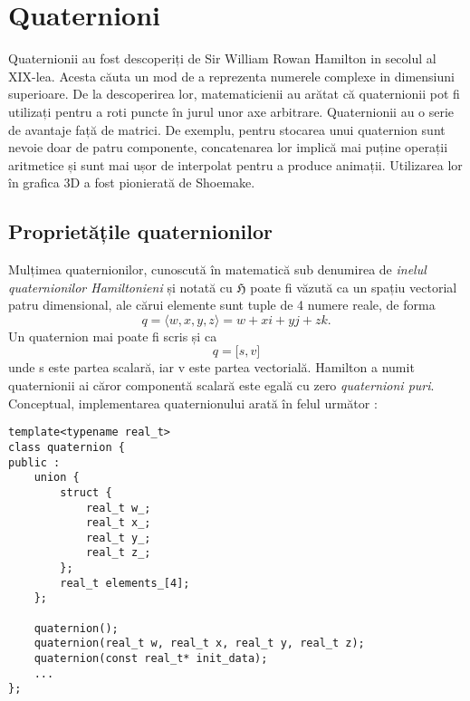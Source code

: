 \section{Quaternioni}
\label{ch1:sec_quaternions}
\indent

Quaternionii au fost descoperiți de Sir William Rowan Hamilton in secolul al
XIX-lea. Acesta căuta un mod de a reprezenta numerele complexe in dimensiuni
superioare. De la descoperirea lor, matematicienii au arătat că quaternionii pot
fi utilizați pentru a roti puncte în jurul unor axe arbitrare.
Quaternionii au o serie de avantaje față de matrici. De exemplu, pentru
stocarea unui quaternion sunt nevoie doar de patru componente, concatenarea lor
implică mai puține operații aritmetice și sunt mai ușor de interpolat pentru a
produce animații. Utilizarea lor în grafica 3D a fost pionierată de Shoemake.

\subsection{Proprietățile quaternionilor}
\label{ch1:sec_quaternions:sub_properties}
\indent

Mulțimea quaternionilor, cunoscută în matematică sub denumirea de \textit{inelul
quaternionilor Hamiltonieni} și notată cu $\mathfrak{H}$ poate fi văzută ca
un spațiu vectorial patru dimensional, ale cărui elemente sunt tuple de 4
numere reale, de forma 
\begin{equation}
q = \langle w, x, y, z\rangle = w + x\mathit{i} + y\mathit{j} + z\mathit{k}.
\end{equation}
Un quaternion mai poate fi scris și ca 
\begin{equation}
q = \lbrack s, v \rbrack
\end{equation} unde s este partea scalară, iar v este partea vectorială.
Hamilton a numit quaternionii ai căror componentă scalară este egală cu zero
\textit{quaternioni puri}.
\newpage
Conceptual, implementarea quaternionului arată în felul următor :
\begin{lstlisting}[]
template<typename real_t>
class quaternion {
public :
    union {
        struct {
            real_t w_;
            real_t x_;
            real_t y_;
            real_t z_;
        };
        real_t elements_[4];
    };

    quaternion();
    quaternion(real_t w, real_t x, real_t y, real_t z);
    quaternion(const real_t* init_data);
    ...
};
\end{lstlisting}

